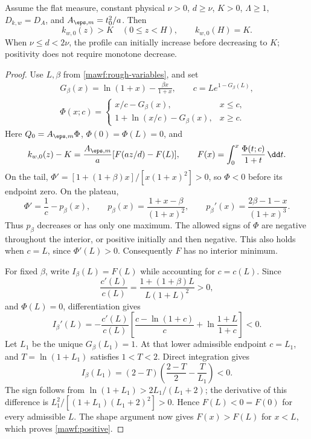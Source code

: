 \begin{proposition}
\label{mawf:positive-proposition}
Assume the flat measure, constant physical \(\nu>0\),
\(d\ge\nu\), \(K>0\), \(\Lambda\ge1\), \(D_{k,w}=D_A\),
and \(A_{\eps,m}=t_0^2/a\). Then
\begin{equation}
 \boxed{k_{w,0}(z)>K\quad(0\le z<H),\qquad k_{w,0}(H)=K.}
 \label{mawf:positive}
\end{equation}
When \(\nu\le d<2\nu\), the profile can initially increase
before decreasing to \(K\); positivity does not require
monotone decrease.
\end{proposition}
\begin{proof}
Use \(L,\beta\) from \cref{mawf:rough-variables}, and set
\begin{equation}
 \begin{gathered}
 G_\beta(x)=\ln(1+x)-\frac{\beta x}{1+x},\qquad
 c=L e^{1-G_\beta(L)},\\
 \Phi(x;c)=
 \begin{cases}
 x/c-G_\beta(x),&x\le c,\\
 1+\ln(x/c)-G_\beta(x),&x\ge c.
 \end{cases}
 \end{gathered}
\end{equation}
Here \(Q_0=A_{\eps,m}\Phi\), \(\Phi(0)=\Phi(L)=0\), and
\begin{equation}
 k_{w,0}(z)-K=\frac{A_{\eps,m}}a[F(az/d)-F(L)],
 \qquad F(x)=\int_0^x\frac{\Phi(t;c)}{1+t}\,\dd t.
 \label{mawf:positivity-F}
\end{equation}
On the tail,
\(\Phi'=[1+(1+\beta)x]/[x(1+x)^2]>0\), so \(\Phi<0\)
before its endpoint zero. On the plateau,
\[
 \Phi'=\frac1c-p_\beta(x),\qquad
 p_\beta(x)=\frac{1+x-\beta}{(1+x)^2},\qquad
 p_\beta'(x)=\frac{2\beta-1-x}{(1+x)^3}.
\]
Thus \(p_\beta\) decreases or has only one maximum.
The allowed signs of \(\Phi\) are negative throughout the
interior, or positive initially and then negative.
This also holds when \(c=L\), since \(\Phi'(L)>0\).
Consequently \(F\) has no interior minimum.

For fixed \(\beta\), write \(I_\beta(L)=F(L)\) while accounting
for \(c=c(L)\). Since
\[
 \frac{c'(L)}{c(L)}
  =\frac{1+(1+\beta)L}{L(1+L)^2}>0,
\]
and \(\Phi(L)=0\), differentiation gives
\begin{equation}
 I_\beta'(L)=-\frac{c'(L)}{c(L)}
 \left[\frac{c-\ln(1+c)}c+\ln\frac{1+L}{1+c}\right]<0.
\end{equation}
Let \(L_1\) be the unique \(G_\beta(L_1)=1\).
At that lower admissible endpoint \(c=L_1\), and
\(T=\ln(1+L_1)\) satisfies \(1<T<2\). Direct integration gives
\begin{equation}
 I_\beta(L_1)
 =(2-T)\left(\frac{2-T}{2}-\frac T{L_1}\right)<0.
\end{equation}
The sign follows from
\(\ln(1+L_1)>2L_1/(L_1+2)\); the derivative of this difference
is \(L_1^2/[(1+L_1)(L_1+2)^2]>0\).
Hence \(F(L)<0=F(0)\) for every admissible \(L\).
The shape argument now gives \(F(x)>F(L)\) for \(x<L\),
which proves \cref{mawf:positive}.
\end{proof}
